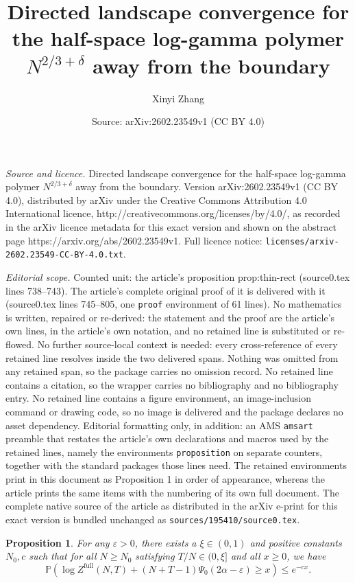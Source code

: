 \documentclass[10pt,a4paper]{amsart}
\title{Directed landscape convergence for the half-space log-gamma polymer $N^{2/3+\delta}$ away from the boundary}
\author{Xinyi Zhang}
\date{Source: arXiv:2602.23549v1 (CC BY 4.0)}
\newtheorem{proposition}{Proposition}
\newcommand{\Prob}{\mathbb{P}}
\newcommand{\Zfull}{Z^{\mathrm{full}}}
\begin{document}
\maketitle

\noindent\emph{Source and licence.} Directed landscape convergence for the half-space log-gamma polymer $N^{2/3+\delta}$ away from the boundary. Version arXiv:2602.23549v1 (CC BY 4.0), distributed by arXiv under the Creative Commons Attribution 4.0 International licence, http://creativecommons.org/licenses/by/4.0/, as recorded in the arXiv licence metadata for this exact version and shown on the abstract page https://arxiv.org/abs/2602.23549v1. Full licence notice: \texttt{licenses/arxiv-2602.23549-CC-BY-4.0.txt}.\par\smallskip

\noindent\textit{Editorial scope.} Counted unit: the article's proposition prop:thin-rect (source0.tex lines 738--743). The article's complete original proof of it is delivered with it (source0.tex lines 745--805, one \texttt{proof} environment of 61 lines). No mathematics is written, repaired or re-derived: the statement and the proof are the article's own lines, in the article's own notation, and no retained line is substituted or re-flowed.  No further source-local context is needed: every cross-reference of every retained line resolves inside the two delivered spans.  Nothing was omitted from any retained span, so the package carries no omission record.  No retained line contains a citation, so the wrapper carries no bibliography and no bibliography entry.  No retained line contains a figure environment, an image-inclusion command or drawing code, so no image is delivered and the package declares no asset dependency.  Editorial formatting only, in addition: an AMS \texttt{amsart} preamble that restates the article's own declarations and macros used by the retained lines, namely the environments \texttt{proposition} on separate counters, together with the standard packages those lines need.  The retained environments print in this document as Proposition 1 in order of appearance, whereas the article prints the same items with the numbering of its own full document.  The complete native source of the article as distributed in the arXiv e-print for this exact version is bundled unchanged as \texttt{sources/195410/source0.tex}.
\begin{proposition}\label{prop:thin-rect}
    For any $\varepsilon > 0$, there exists a $\xi \in (0,1)$ and positive constants $N_0, c$ such that for all $N \geq N_0$ satisfying $T/N \in (0, \xi]$ and all $x \geq 0$, we have
    \begin{equation}\label{eq:thin_rect}
        \Prob\left(\log \Zfull(N,T) + (N+T-1)\Psi_0(2\alpha-\varepsilon)\geq x \right) \leq e^{-cx}.
    \end{equation}  
\end{proposition}
\end{document}
